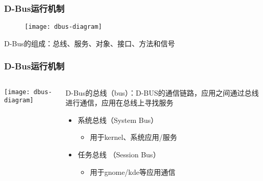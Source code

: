 \begin{frame}[plain]
	\frametitle{D-Bus运行机制}
    \begin{figure}
    \centering
    \texttt{[image: dbus-diagram]}
    \end{figure}
    \centering D-Bus的组成：总线、服务、对象、接口、方法和信号

\end{frame}
\begin{frame}[fragile]
	\frametitle{D-Bus运行机制}
	
	\begin{columns}
		\begin{column}{.4\textwidth}
			
			\texttt{[image: dbus-diagram]}
			
		\end{column}
		\begin{column}{.6\textwidth}
			D-Bus的总线（bus）：D-BUS的通信链路，应用之间通过总线进行通信，应用在总线上寻找服务
            \begin{itemize}
                \item 系统总线（System Bus）
                \begin{itemize}
                    \item 用于kernel、系统应用/服务
                \end{itemize}
                \item 任务总线 （Session Bus）
                \begin{itemize}
                    \item 用于gnome/kde等应用通信
                \end{itemize}
            \end{itemize}
		\end{column}
	\end{columns}
\end{frame}

